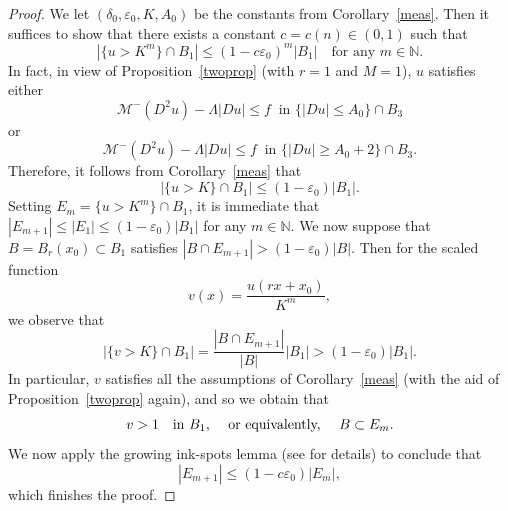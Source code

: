 \documentclass[11pt]{amsart}
\theoremstyle{plain}
\theoremstyle{definition}
\numberwithin{equation}{section}
\begin{document}
\begin{proof}
    We let $(\delta_0, \varepsilon_0, K, A_0)$ be the constants from Corollary~\ref{meas}. Then it suffices to show that there exists a constant $c=c(n) \in (0,1)$ such that
\begin{equation*}
    |\{ u > K^m\} \cap B_1| \leq (1-c\varepsilon_0 )^m |B_1| \quad \text{for any $m \in \mathbb{N}$}.
\end{equation*}
    In fact, in view of Proposition~\ref{twoprop} (with $r=1$ and $M=1$), $u$ satisfies either
    \begin{equation*}
        \mathcal{M}^-(D^2u)-\Lambda|Du| \leq f \ \text{ in } \{|Du| \leq A_0\} \cap B_{3}
    \end{equation*}
    or
    \begin{equation*}
        \mathcal{M}^-(D^2u)-\Lambda|Du| \leq f  \ \text{ in } \{|Du| \geq A_0+2\} \cap B_{3}.
    \end{equation*}
   Therefore, it follows from Corollary~\ref{meas} that 
   \begin{equation*}
       |\{ u > K\} \cap B_1| \leq (1-\varepsilon_0 ) |B_1|.
   \end{equation*}
    Setting $E_m =\{u>K^m\} \cap B_1$, it is immediate that $|E_{m+1}| \leq |E_1| \leq (1-\varepsilon_0)|B_1|$ for any $m \in \mathbb{N}$. We now suppose that $B=B_r(x_0) \subset B_1$ satisfies $|B \cap E_{m+1}| > (1-\varepsilon_0)|B|$. Then for the scaled function
    \begin{equation*}
        v(x)=\frac{u(rx+x_0)}{K^{m}},
    \end{equation*}
    we observe that
    \begin{equation*}
        |\{v>K\} \cap B_1|=\frac{|B \cap E_{m+1}|}{|B|}|B_1| >(1-\varepsilon_0)|B_1|.
    \end{equation*}
    In particular, $v$ satisfies all the assumptions of Corollary~\ref{meas} (with the aid of Proposition~\ref{twoprop} again), and so we obtain that
    \begin{equation*}
        v >1 \quad \text{in $B_1$, \quad or equivalently, \quad $B \subset E_m$}.
    \end{equation*}
    We now apply the growing ink-spots lemma (see \cite[Lemma~2.1]{IS16} for details) to conclude that
    \begin{equation*}
        |E_{m+1}| \leq (1-c\varepsilon_0)|E_m|,
    \end{equation*}
    which finishes the proof.
\end{proof}
\end{document}
